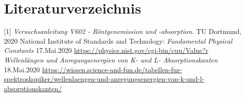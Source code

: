 \documentclass[titlepage = firstcover]{scrartcl}
\begin{document}
           
            \newpage
            \section{Literaturverzeichnis}
                    [1] \textit{Versuchsanleitung V602 - Röntgenemission und -absorption.} TU Dortmund, 2020 \newline
                    [2] National Institute of Standards and Technology: \textit{Fundamental Physical Constants} 17.Mai.2020
                        \url{https://physics.nist.gov/cgi-bin/cuu/Value?r} \newline
                    [3] \textit{Wellenlängen und Anregungsenergien von K- und L- Absorptionskanten} 18.Mai.2020
                        \url{https://wissen.science-and-fun.de/tabellen-fur-spektroskopiker/wellenlaengen-und-anregungsenergien-von-k-und-l-absorptionskanten/}
        
            \newpage
\end{document}

